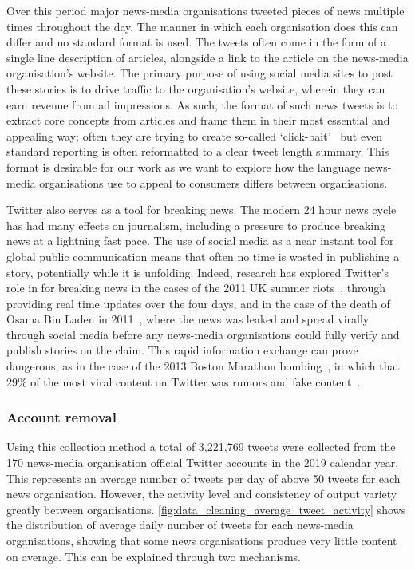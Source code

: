 Over this period major news-media organisations tweeted pieces of news multiple times throughout the day. The manner in which each organisation does this can differ and no standard format is used. The tweets often come in the form of a single line description of articles, alongside a link to the article on the news-media organisation's website. The primary purpose of using social media sites to post these stories is to drive traffic to the organisation's website, wherein they can earn revenue from ad impressions. As such, the format of such news tweets is to extract core concepts from articles and frame them in their most essential and appealing way; often they are trying to create so-called `click-bait'~\cite{potthastCrowdsourcingLargeCorpus2018} but even standard reporting is often reformatted to a clear tweet length summary. This format is desirable for our work as we want to explore how the language news-media organisations use to appeal to consumers differs between organisations.

Twitter also serves as a tool for breaking news. The modern 24 hour news cycle has had many effects on journalism, including a pressure to produce breaking news at a lightning fast pace. The use of social media as a near instant tool for global public communication means that often no time is wasted in publishing a story, potentially while it is unfolding. Indeed, research has explored Twitter's role in for breaking news in the cases of the 2011 UK summer riots~\cite{vis_Twitter_2013}, through providing real time updates over the four days, and in the case of the death of Osama Bin Laden in 2011~\cite{hu_breaking_2012}, where the news was leaked and spread virally through social media before any news-media organisations could fully verify and publish stories on the claim. %
This rapid information exchange can prove dangerous, as in the case of the 2013 Boston Marathon bombing~\cite{starbird_rumors_2014}, in which that 29\% of the most viral content on Twitter was rumors and fake content~\cite{gupta_100_2013}.

\subsubsection{Account removal}
Using this collection method a total of 3,221,769 tweets were collected from the 170 news-media organisation official Twitter accounts in the 2019 calendar year. This represents an average number of tweets per day of above 50 tweets for each news organisation. However, the activity level and consistency of output variety greatly between organisations. \autoref{fig:data_cleaning_average_tweet_activity} shows the distribution of average daily number of tweets for each news-media organisations, showing that some news organisations produce very little content on average. This can be explained through two mechanisms.

